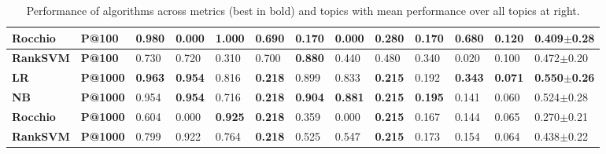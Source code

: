 \begin{table*}[t!]
{{\begin{tabular}{|l|l|l|l|l|l|l|l|l|l|l|l|l|}
\textbf{Rocchio} & \textbf{P@100} & \textbf{0.980} & 0.000 & \textbf{1.000} & 0.690 & 0.170 & 0.000 & 0.280 & 0.170 & 0.680 & 0.120 & 0.409$\pm$0.28 \\ \hline
\textbf{RankSVM} & \textbf{P@100} & 0.730 & 0.720 & 0.310 & 0.700 & \textbf{0.880} & 0.440 & 0.480 & 0.340 & 0.020 & 0.100 & 0.472$\pm$0.20 \\ \hline \hline
\textbf{LR} & \textbf{P@1000} & \textbf{0.963} & \textbf{0.954} & 0.816 & \textbf{0.218} & 0.899 & 0.833 & \textbf{0.215} & 0.192 & \textbf{0.343} & \textbf{0.071} & \textbf{0.550$\pm$0.26} \\ \hline
\textbf{NB} & \textbf{P@1000} & 0.954 & \textbf{0.954} & 0.716 & \textbf{0.218} & \textbf{0.904} & \textbf{0.881} & \textbf{0.215} & \textbf{0.195} & 0.141 & 0.060 & 0.524$\pm$0.28 \\ \hline
\textbf{Rocchio} & \textbf{P@1000} & 0.604 & 0.000 & \textbf{0.925} & \textbf{0.218} & 0.359 & 0.000 & \textbf{0.215} & 0.167 & 0.144 & 0.065 & 0.270$\pm$0.21 \\ \hline
\textbf{RankSVM} & \textbf{P@1000} & 0.799 & 0.922 & 0.764 & \textbf{0.218} & 0.525 & 0.547 & \textbf{0.215} & 0.173 & 0.154 & 0.064 & 0.438$\pm$0.22 \\ \hline
\end{tabular}
}}
\caption{Performance of algorithms across metrics (best in bold) and topics with 
mean performance over all topics at right.} 
\label{table:results2}
\end{table*}

